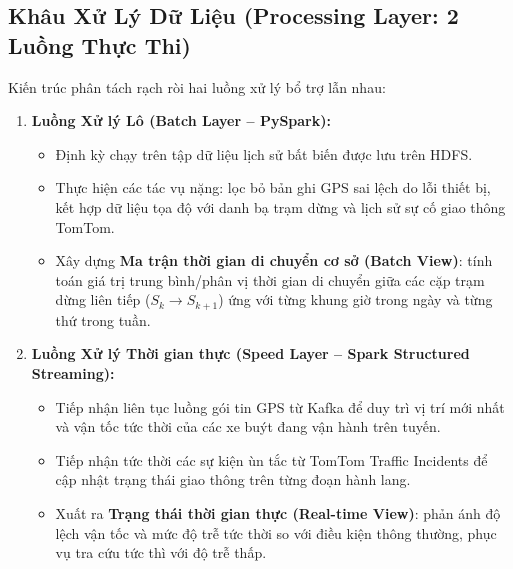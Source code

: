 \documentclass[11pt,a4paper]{article}
\begin{document}
\subsection{Khâu Xử Lý Dữ Liệu (Processing Layer: 2 Luồng Thực Thi)}
Kiến trúc phân tách rạch ròi hai luồng xử lý bổ trợ lẫn nhau:
\begin{enumerate}[leftmargin=*,noitemsep,topsep=1.5pt]
    \item \textbf{Luồng Xử lý Lô (Batch Layer -- PySpark):}
    \begin{itemize}[leftmargin=*,noitemsep]
        \item Định kỳ chạy trên tập dữ liệu lịch sử bất biến được lưu trên HDFS.
        \item Thực hiện các tác vụ nặng: lọc bỏ bản ghi GPS sai lệch do lỗi thiết bị, kết hợp dữ liệu tọa độ với danh bạ trạm dừng và lịch sử sự cố giao thông TomTom.
        \item Xây dựng \textbf{Ma trận thời gian di chuyển cơ sở (Batch View)}: tính toán giá trị trung bình/phân vị thời gian di chuyển giữa các cặp trạm dừng liên tiếp ($S_k \to S_{k+1}$) ứng với từng khung giờ trong ngày và từng thứ trong tuần.
    \end{itemize}
    \item \textbf{Luồng Xử lý Thời gian thực (Speed Layer -- Spark Structured Streaming):}
    \begin{itemize}[leftmargin=*,noitemsep]
        \item Tiếp nhận liên tục luồng gói tin GPS từ Kafka để duy trì vị trí mới nhất và vận tốc tức thời của các xe buýt đang vận hành trên tuyến.
        \item Tiếp nhận tức thời các sự kiện ùn tắc từ TomTom Traffic Incidents để cập nhật trạng thái giao thông trên từng đoạn hành lang.
        \item Xuất ra \textbf{Trạng thái thời gian thực (Real-time View)}: phản ánh độ lệch vận tốc và mức độ trễ tức thời so với điều kiện thông thường, phục vụ tra cứu tức thì với độ trễ thấp.
    \end{itemize}
\end{enumerate}
\end{document}
